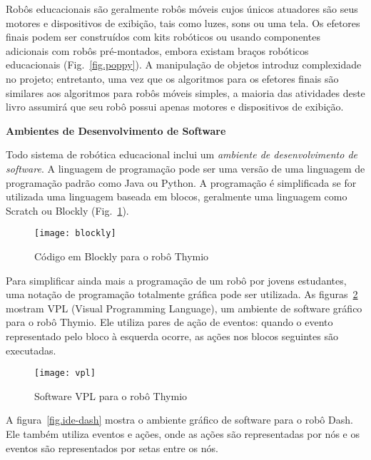 Robôs educacionais são geralmente robôs móveis cujos únicos atuadores são seus motores e dispositivos de exibição, tais como luzes, sons ou uma tela. Os efetores finais podem ser construídos com kits robóticos ou usando componentes adicionais com robôs pré-montados, embora existam braços robóticos educacionais (Fig.~\ref{fig.poppy}). A manipulação de objetos introduz complexidade no projeto; entretanto, uma vez que os algoritmos para os efetores finais são similares aos algoritmos para robôs móveis simples, a maioria das atividades deste livro assumirá que seu robô possui apenas motores e dispositivos de exibição.

\smallskip

\noindent\textbf{Ambientes de Desenvolvimento de Software}

Todo sistema de robótica educacional inclui um \emph{ambiente de desenvolvimento de software}. A linguagem de programação pode ser uma versão de uma linguagem de programação padrão como Java ou Python. A programação é simplificada se for utilizada uma linguagem baseada em blocos, geralmente uma linguagem como Scratch ou Blockly (Fig.~\ref{fig.ide-blocks}).

\begin{figure}
\begin{center}
\texttt{[image: blockly]}
\end{center}
\caption{Código em Blockly para o robô Thymio}\label{fig.ide-blocks}
\end{figure}

Para simplificar ainda mais a programação de um robô por jovens estudantes, uma notação de programação totalmente gráfica pode ser utilizada. As figuras~\ref{fig.ide-thymio} mostram VPL (Visual Programming Language), um ambiente de software gráfico para o robô Thymio. Ele utiliza pares de ação de eventos: quando o evento representado pelo bloco à esquerda ocorre, as ações nos blocos seguintes são executadas.

\begin{figure}
\begin{center}
\texttt{[image: vpl]}
\end{center}
\caption{Software VPL para o robô Thymio}\label{fig.ide-thymio}
\end{figure}

A figura~\ref{fig.ide-dash} mostra o ambiente gráfico de software para o robô Dash. Ele também utiliza eventos e ações, onde as ações são representadas por nós e os eventos são representados por setas entre os nós.

